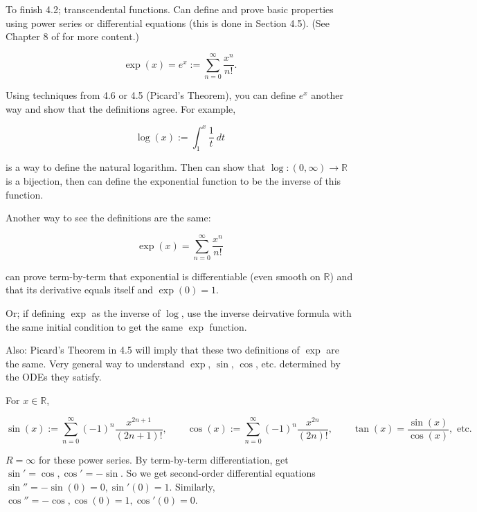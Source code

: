To finish 4.2; transcendental functions. Can define and prove basic properties using power series or differential equations (this is done in Section 4.5). (See Chapter 8 of \citet{rudin1976principles} for more content.)

\begin{definition}

\[
\exp(x) = e^x := \sum_{n=0}^\infty \frac{x^n}{n!}.
\]

\end{definition}

\begin{remark}

Using techniques from 4.6 or 4.5 (Picard's Theorem), you can define \(e^x\) another way and show that the definitions agree. For example,

\[
\log(x) := \int_1^x \frac{1}{t} \ dt
\]

is a way to define the natural logarithm. Then can show that \(\log: (0, \infty) \to \mathbb{R}\) is a bijection, then can define the exponential function to be the inverse of this function. 

Another way to see the definitions are the same:

\[
\exp(x) = \sum_{n=0}^\infty \frac{x^n}{n!} 
\]

can prove term-by-term that exponential is differentiable (even smooth on \(\mathbb{R}\)) and that its derivative equals itself and \(\exp(0) = 1\). 

Or; if defining \(\exp\) as the inverse of \(\log\), use the inverse deirvative formula with the same initial condition to get the same \(\exp\) function. 

Also: Picard's Theorem in 4.5 will imply that these two definitions of \(\exp\) are the same. Very general way to understand \(\exp\), \(\sin\), \(\cos\), etc. determined by the ODEs they satisfy.

\end{remark}

\begin{definition}

For \(x \in \mathbb{R}\), 


\[
\sin(x) := \sum_{n=0}^\infty (-1)^n \frac{x^{2n + 1}}{(2n +1)!}, \qquad \cos(x) := \sum_{n=0}^\infty (-1)^n \frac{x^{2n}}{(2n)!}, \qquad \tan(x) = \frac{\sin(x)}{\cos(x)},  \text{ etc.}
\]

\end{definition}

\begin{exercise}

\(R = \infty\) for these power series. By term-by-term differentiation, get \(\sin ' = \cos, \cos' = - \sin\). So we get second-order differential equations \(\sin'' = -\sin(0) = 0, \sin'(0) = 1\). Similarly, \(\cos'' = - \cos, \cos(0) = 1, \cos'(0) = 0\). 

\end{exercise}


